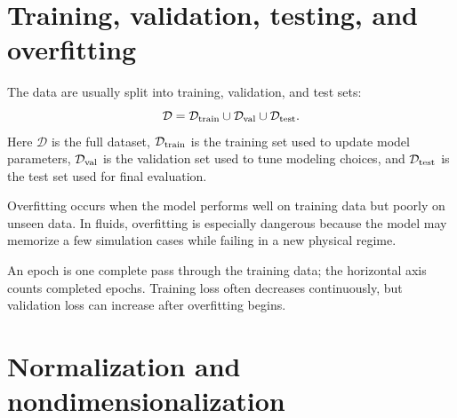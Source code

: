\documentclass[11pt]{article}
\begin{document}


\section{Training, validation, testing, and overfitting}

The data are usually split into training, validation, and test sets:
\begin{equation}
    \mathcal{D}=\mathcal{D}_{\rm train}\cup\mathcal{D}_{\rm val}\cup\mathcal{D}_{\rm test}.
    \label{eq:data_split}
\end{equation}
Here $\mathcal{D}$ is the full dataset, $\mathcal{D}_{\rm train}$ is the training set used to update model parameters, $\mathcal{D}_{\rm val}$ is the validation set used to tune modeling choices, and $\mathcal{D}_{\rm test}$ is the test set used for final evaluation.

Overfitting occurs when the model performs well on training data but poorly on unseen data.  In fluids, overfitting is especially dangerous because the model may memorize a few simulation cases while failing in a new physical regime.

\begin{center}
\end{center}

An epoch is one complete pass through the training data; the horizontal axis counts completed epochs.  Training loss often decreases continuously, but validation loss can increase after overfitting begins.

\section{Normalization and nondimensionalization}
\end{document}
